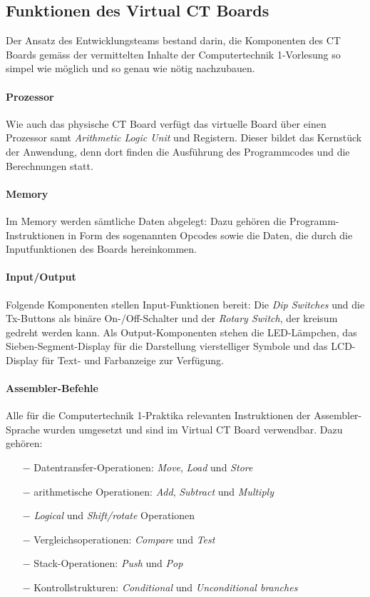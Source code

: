\documentclass[10pt]{article}
\begin{document}

\subsection{Funktionen des \glqq Virtual CT Boards\grqq}

Der Ansatz des Entwicklungsteams bestand darin, die Komponenten des CT Boards gemäss der vermittelten Inhalte der \glqq Computertechnik 1\grqq-Vorlesung so simpel wie möglich und so genau wie nötig nachzubauen.

\paragraph{Prozessor} Wie auch das physische CT Board verfügt das virtuelle Board über einen Prozessor samt \emph{Arithmetic Logic Unit} und Registern. Dieser bildet das Kernstück der Anwendung, denn dort finden die Ausführung des Programmcodes und die Berechnungen statt. 

\paragraph{Memory} Im Memory werden sämtliche Daten abgelegt: Dazu gehören die Programm-Instruktionen in Form des sogenannten Opcodes sowie die Daten, die durch die Inputfunktionen des Boards hereinkommen.

\paragraph{Input/Output} Folgende Komponenten stellen Input-Funktionen bereit: Die \emph{Dip Switches} und die Tx-Buttons als binäre On-/Off-Schalter und der \emph{Rotary Switch}, der kreisum gedreht werden kann. Als Output-Komponenten stehen die LED-Lämpchen, das Sieben-Segment-Display für die Darstellung vierstelliger Symbole und das LCD-Display für Text- und Farbanzeige zur Verfügung.

\paragraph{Assembler-Befehle} Alle für die \glqq Computertechnik 1\grqq-Praktika relevanten Instruktionen der Assembler-Sprache wurden umgesetzt und sind im \glqq Virtual CT Board\grqq{} verwendbar. Dazu gehören:
\begin{itemize}
	\item[$-$] Datentransfer-Operationen: \emph{Move}, \emph{Load} und \emph{Store}
	\item[$-$] arithmetische Operationen: \emph{Add}, \emph{Subtract} und \emph{Multiply}
	\item[$-$] \emph{Logical} und \emph{Shift/rotate} Operationen
	\item[$-$] Vergleichsoperationen: \emph{Compare} und \emph{Test}
	\item[$-$] Stack-Operationen: \emph{Push} und \emph{Pop} %
	\item[$-$] Kontrollstrukturen: \emph{Conditional} und \emph{Unconditional branches}
\end{itemize}
\end{document}
